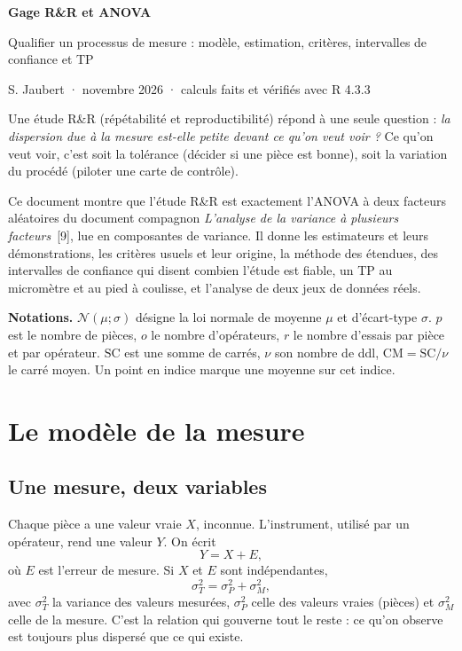 \documentclass[11pt,a4paper]{article}
\theoremstyle{sj}
\theoremstyle{definition}
\theoremstyle{remark}
\newcommand{\N}{\mathcal{N}}
\newcommand{\SC}{\mathrm{SC}}
\newcommand{\CM}{\mathrm{CM}}
\begin{document}
{\raggedright\Huge\bfseries\color{bleu} Gage R\&R et ANOVA\par}
\medskip
{\large Qualifier un processus de mesure : modèle, estimation, critères, intervalles de confiance et TP\par}
\medskip
{\small S. Jaubert · novembre 2026 · calculs faits et vérifiés avec R 4.3.3\par}

\bigskip
Une étude R\&R (répétabilité et reproductibilité) répond à une seule question : \emph{la dispersion due à la mesure est-elle petite devant ce qu'on veut voir ?} Ce qu'on veut voir, c'est soit la tolérance (décider si une pièce est bonne), soit la variation du procédé (piloter une carte de contrôle).

Ce document montre que l'étude R\&R est exactement l'ANOVA à deux facteurs aléatoires du document compagnon \emph{L'analyse de la variance à plusieurs facteurs}~[9], lue en composantes de variance. Il donne les estimateurs et leurs démonstrations, les critères usuels et leur origine, la méthode des étendues, des intervalles de confiance qui disent combien l'étude est fiable, un TP au micromètre et au pied à coulisse, et l'analyse de deux jeux de données réels.

\textbf{Notations.} $\N(\mu;\sigma)$ désigne la loi normale de moyenne $\mu$ et d'écart-type $\sigma$. $p$ est le nombre de pièces, $o$ le nombre d'opérateurs, $r$ le nombre d'essais par pièce et par opérateur. $\SC$ est une somme de carrés, $\nu$ son nombre de ddl, $\CM=\SC/\nu$ le carré moyen. Un point en indice marque une moyenne sur cet indice.

\tableofcontents

\section{Le modèle de la mesure}\label{sec:modele}

\subsection{Une mesure, deux variables}

Chaque pièce a une valeur vraie $X$, inconnue. L'instrument, utilisé par un opérateur, rend une valeur $Y$. On écrit
\[
Y=X+E,
\]
où $E$ est l'erreur de mesure. Si $X$ et $E$ sont indépendantes,
\[
\sigma_T^2=\sigma_P^2+\sigma_M^2,
\]
avec $\sigma_T^2$ la variance des valeurs mesurées, $\sigma_P^2$ celle des valeurs vraies (pièces) et $\sigma_M^2$ celle de la mesure. C'est la relation qui gouverne tout le reste : ce qu'on observe est toujours plus dispersé que ce qui existe.
\end{document}
